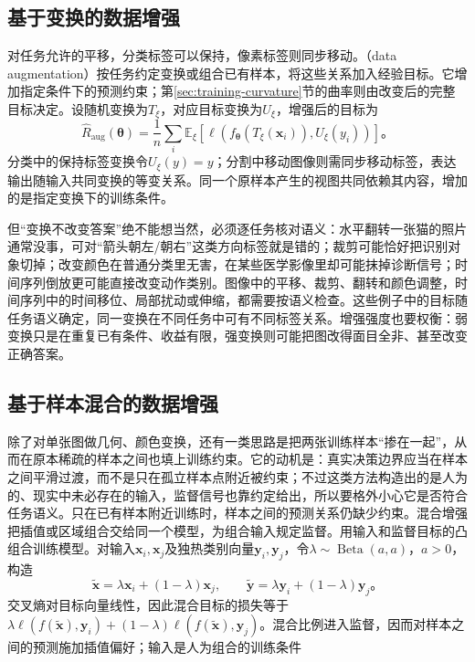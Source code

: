 \subsection{基于变换的数据增强}
\label{sec:generalization-transform-augmentation}

对任务允许的平移，分类标签可以保持，像素标签则同步移动。（data augmentation）按任务约定变换或组合已有样本，将这些关系加入经验目标。它增加指定条件下的预测约束；第\ref{sec:training-curvature}节的曲率则由改变后的完整目标决定。设随机变换为$T_{\xi}$，对应目标变换为$U_{\xi}$，增强后的目标为
\begin{equation}
  \hat R_{\mathrm{aug}}(\bm\theta)
  =\frac1n\sum_i\mathbb E_{\xi}
    [\ell(f_{\bm\theta}(T_{\xi}(\bm x_i)),U_{\xi}(y_i))]\text{。}
  \label{eq:generalization-augmentation-risk}
\end{equation}
分类中的保持标签变换令$U_{\xi}(y)=y$；分割中移动图像则需同步移动标签，表达输出随输入共同变换的等变关系。同一个原样本产生的视图共同依赖其内容，增加的是指定变换下的训练条件。

但“变换不改变答案”绝不能想当然，必须逐任务核对语义：水平翻转一张猫的照片通常没事，可对“箭头朝左/朝右”这类方向标签就是错的；裁剪可能恰好把识别对象切掉；改变颜色在普通分类里无害，在某些医学影像里却可能抹掉诊断信号；时间序列倒放更可能直接改变动作类别。图像中的平移、裁剪、翻转和颜色调整，时间序列中的时间移位、局部扰动或伸缩，都需要按语义检查。这些例子中的目标随任务语义确定，同一变换在不同任务中可有不同标签关系。增强强度也要权衡：弱变换只是在重复已有条件、收益有限，强变换则可能把图改得面目全非、甚至改变正确答案。

\subsection{基于样本混合的数据增强}
\label{sec:generalization-sample-mixing}

除了对单张图做几何、颜色变换，还有一类思路是把两张训练样本“掺在一起”，从而在原本稀疏的样本之间也填上训练约束。它的动机是：真实决策边界应当在样本之间平滑过渡，而不是只在孤立样本点附近被约束；不过这类方法构造出的是人为的、现实中未必存在的输入，监督信号也靠约定给出，所以要格外小心它是否符合任务语义。只在已有样本附近训练时，样本之间的预测关系仍缺少约束。混合增强把插值或区域组合交给同一个模型，为组合输入规定监督。用输入和监督目标的凸组合训练模型。对输入$\bm x_i,\bm x_j$及独热类别向量$\bm y_i,\bm y_j$，令$\lambda\sim\operatorname{Beta}(a,a)$，$a>0$，构造
\begin{equation}
  \tilde{\bm x}=\lambda\bm x_i+(1-\lambda)\bm x_j,\qquad
  \tilde{\bm y}=\lambda\bm y_i+(1-\lambda)\bm y_j\text{。}
  \label{eq:generalization-mixup}
\end{equation}
交叉熵对目标向量线性，因此混合目标的损失等于$\lambda\ell(f(\tilde{\bm x}),\bm y_i)+(1-\lambda)\ell(f(\tilde{\bm x}),\bm y_j)$。混合比例进入监督，因而对样本之间的预测施加插值偏好；输入是人为组合的训练条件

